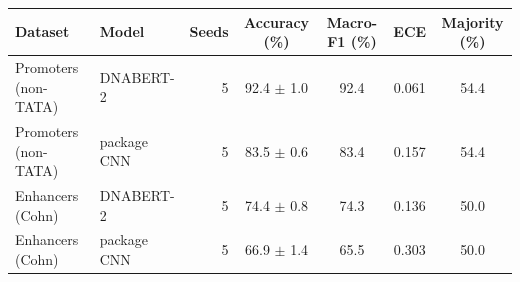 \begin{tabular}{llrcccc}
\toprule
Dataset & Model & Seeds & Accuracy (\%) & Macro-F1 (\%) & ECE & Majority (\%) \\
\midrule
Promoters (non-TATA) & DNABERT-2 & 5 & 92.4 $\pm$ 1.0 & 92.4 & 0.061 & 54.4 \\
Promoters (non-TATA) & package CNN & 5 & 83.5 $\pm$ 0.6 & 83.4 & 0.157 & 54.4 \\
Enhancers (Cohn) & DNABERT-2 & 5 & 74.4 $\pm$ 0.8 & 74.3 & 0.136 & 50.0 \\
Enhancers (Cohn) & package CNN & 5 & 66.9 $\pm$ 1.4 & 65.5 & 0.303 & 50.0 \\
\bottomrule
\end{tabular}
